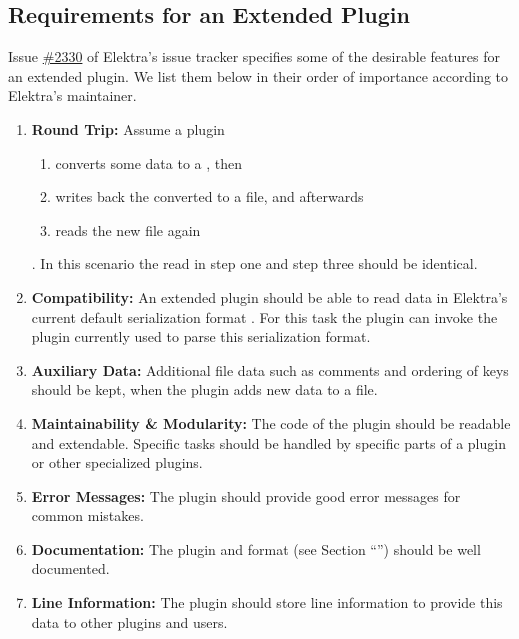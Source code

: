 \subsection{Requirements for an Extended  Plugin}
\label{sec:requirements_extended_yaml_plugin}

Issue \href{https://issues.libelektra.org/2330}{\#2330} of Elektra’s issue tracker specifies some of the desirable features for an extended  plugin. We list them below in their order of importance according to Elektra’s maintainer.

\begin{enumerate}
  \item \textbf{Round Trip:}
  Assume a plugin
  \begin{enumerate}
    \item converts some  data to a , then
    \item writes back the converted  to a  file, and afterwards
    \item reads the new  file again
  \end{enumerate}
  . In this scenario the  read in step one and step three should be identical.

  \item \textbf{Compatibility:} An extended  plugin should be able to read data in Elektra’s current default serialization format . For this task the plugin can invoke the plugin currently used to parse this serialization format.

  \item \textbf{Auxiliary Data:} Additional file data such as comments and ordering of keys should be kept, when the plugin adds new data to a  file.

  \item \textbf{Maintainability \& Modularity:} The code of the plugin should be readable and extendable. Specific tasks should be handled by specific parts of a plugin or other specialized plugins.

  \item \textbf{Error Messages:} The plugin should provide good error messages for common mistakes.

  \item \textbf{Documentation:} The  plugin and format (see Section “”) should be well documented.

  \item \textbf{Line Information:} The plugin should store line information to provide this data to other plugins and users.
\end{enumerate}

